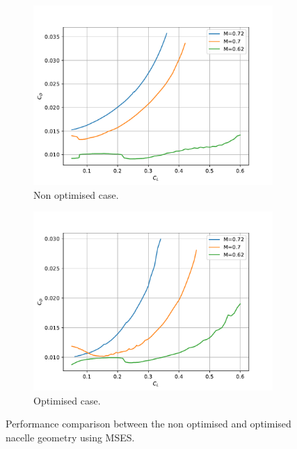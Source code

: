 \begin{figure}[!h]
	\centering
	\begin{subfigure}{0.45\textwidth}
		\includegraphics[keepaspectratio, width=\linewidth]{images/chap4/clcd_nacelle_non_opt_comparison}
		\caption{Non optimised case.}
		\label{fig:clcd_nacelle_non_optim}
	\end{subfigure}
	\begin{subfigure}{0.45\textwidth}
		\includegraphics[keepaspectratio, width=\linewidth]{images/chap4/clcd_nacelle_opt_comparison}
		\caption{Optimised case.}
		\label{fig:clcd_nacelle_optim}
	\end{subfigure}
	\caption{Performance comparison between the non optimised and optimised nacelle geometry using MSES.}
	\label{fig:clcd_nacelle_integration_performance}
\end{figure}

